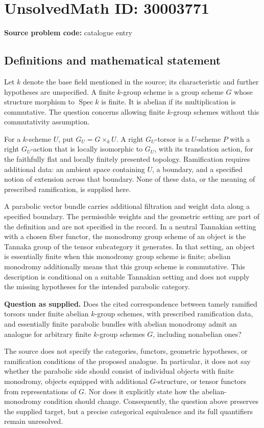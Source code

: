 \documentclass[11pt]{article}
\begin{document}
\section*{UnsolvedMath ID: 30003771}
\textbf{Source problem code:} catalogue entry
\subsection{Definitions and mathematical statement}
Let \(k\) denote the base field mentioned in the source; its characteristic and further hypotheses are unspecified. A finite \(k\)-group scheme is a group scheme \(G\) whose structure morphism to \(\operatorname{Spec} k\) is finite. It is abelian if its multiplication is commutative. The question concerns allowing finite \(k\)-group schemes without this commutativity assumption.

For a \(k\)-scheme \(U\), put \(G_U=G\times_k U\). A right \(G_U\)-torsor is a \(U\)-scheme \(P\) with a right \(G_U\)-action that is locally isomorphic to \(G_U\), with its translation action, for the faithfully flat and locally finitely presented topology. Ramification requires additional data: an ambient space containing \(U\), a boundary, and a specified notion of extension across that boundary. None of these data, or the meaning of prescribed ramification, is supplied here.

A parabolic vector bundle carries additional filtration and weight data along a specified boundary. The permissible weights and the geometric setting are part of the definition and are not specified in the record. In a neutral Tannakian setting with a chosen fiber functor, the monodromy group scheme of an object is the Tannaka group of the tensor subcategory it generates. In that setting, an object is essentially finite when this monodromy group scheme is finite; abelian monodromy additionally means that this group scheme is commutative. This description is conditional on a suitable Tannakian setting and does not supply the missing hypotheses for the intended parabolic category.

\textbf{Question as supplied.} Does the cited correspondence between tamely ramified torsors under finite abelian \(k\)-group schemes, with prescribed ramification data, and essentially finite parabolic bundles with abelian monodromy admit an analogue for arbitrary finite \(k\)-group schemes \(G\), including nonabelian ones?

The source does not specify the categories, functors, geometric hypotheses, or ramification conditions of the proposed analogue. In particular, it does not say whether the parabolic side should consist of individual objects with finite monodromy, objects equipped with additional \(G\)-structure, or tensor functors from representations of \(G\). Nor does it explicitly state how the abelian-monodromy condition should change. Consequently, the question above preserves the supplied target, but a precise categorical equivalence and its full quantifiers remain unresolved.
\end{document}
